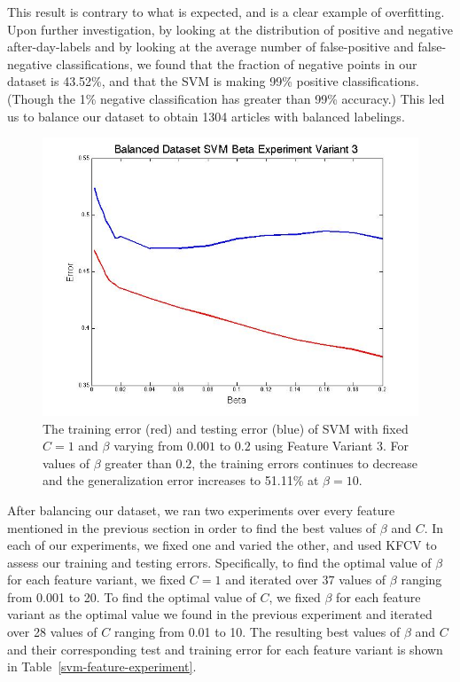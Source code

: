\documentclass{article}
\begin{document}
This result is contrary to what is expected, and is a clear example of overfitting. Upon further investigation, by looking at the distribution of positive and negative after-day-labels and by looking at the average number of false-positive and false-negative classifications, we found that the fraction of negative points in our dataset is 43.52\%, and that the SVM is making 99\% positive classifications. (Though the 1\% negative classification has greater than 99\% accuracy.) This led us to balance our dataset to obtain 1304 articles with balanced labelings. 


\begin{figure}[hb]
\vskip 0.1in
\begin{center}
\centerline{\includegraphics[width=\columnwidth]{beta_experiment_feat_v3.jpg}} 
\caption{The training error (red) and testing error (blue) of SVM with fixed $C=1$ and $\beta$ varying from $0.001$ to $0.2$ using Feature Variant 3. For values of $\beta$ greater than $0.2$, the training errors continues to decrease and the generalization error increases to 51.11\% at $\beta=10$.}
\label{feat-v3-experiment}
\end{center}
\vskip -0.2in
\end{figure} 


After balancing our dataset, we ran two experiments over every feature mentioned in the previous section in order to find the best values of $\beta$ and $C$. In each of our experiments, we fixed one and varied the other, and used KFCV to assess our training and testing errors. Specifically, to find the optimal value of $\beta$ for each feature variant, we fixed $C=1$ and iterated over 37 values of $\beta$ ranging from 0.001 to 20. To find the optimal value of $C$, we fixed $\beta$ for each feature variant as the optimal value we found in the previous experiment and iterated over 28 values of $C$ ranging from 0.01 to 10. The resulting best values of $\beta$ and $C$ and their corresponding test and training error for each feature variant is shown in Table~\ref{svm-feature-experiment}. 
\end{document}
